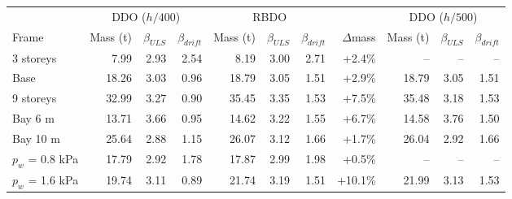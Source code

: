 \begin{tabular}{lrrrrrrrrrr}
\toprule
 & \multicolumn{3}{c}{DDO ($h/400$)} & \multicolumn{3}{c}{RBDO} & & \multicolumn{3}{c}{DDO ($h/500$)} \\
\cmidrule(lr){2-4}\cmidrule(lr){5-7}\cmidrule(lr){9-11}
Frame & Mass (t) & $\beta_{ULS}$ & $\beta_{drift}$ & Mass (t) & $\beta_{ULS}$ & $\beta_{drift}$ & $\Delta$mass & Mass (t) & $\beta_{ULS}$ & $\beta_{drift}$ \\
\midrule
3 storeys & 7.99 & 2.93 & 2.54 & 8.19 & 3.00 & 2.71 & +2.4\% & -- & -- & -- \\
Base & 18.26 & 3.03 & 0.96 & 18.79 & 3.05 & 1.51 & +2.9\% & 18.79 & 3.05 & 1.51 \\
9 storeys & 32.99 & 3.27 & 0.90 & 35.45 & 3.35 & 1.53 & +7.5\% & 35.48 & 3.18 & 1.53 \\
Bay 6 m & 13.71 & 3.66 & 0.95 & 14.62 & 3.22 & 1.55 & +6.7\% & 14.58 & 3.76 & 1.50 \\
Bay 10 m & 25.64 & 2.88 & 1.15 & 26.07 & 3.12 & 1.66 & +1.7\% & 26.04 & 2.92 & 1.66 \\
$p_w$ = 0.8 kPa & 17.79 & 2.92 & 1.78 & 17.87 & 2.99 & 1.98 & +0.5\% & -- & -- & -- \\
$p_w$ = 1.6 kPa & 19.74 & 3.11 & 0.89 & 21.74 & 3.19 & 1.51 & +10.1\% & 21.99 & 3.13 & 1.53 \\
\bottomrule
\end{tabular}